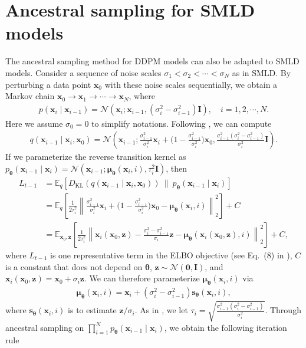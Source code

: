 \documentclass{article} %
\newcommand{\mbb}[1]{\mathbb{#1}}
\newcommand{\mcal}{\mathcal}
\newcommand{\norm}[1]{\left\lVert#1\right\rVert}
\newcommand{\bfx}{\mathbf{x}}
\newcommand{\bfz}{\mathbf{z}}
\newcommand{\bfI}{\mathbf{I}}
\newcommand{\bfzero}{\mathbf{0}}
\newcommand{\bftheta}{{\boldsymbol{\theta}}}
\newcommand{\bfs}{\mathbf{s}}
\newcommand{\bfmu}{{\boldsymbol \mu}}
\begin{document}
\section{Ancestral sampling for SMLD models}\label{app:ancestral}
The ancestral sampling method for DDPM models can also be adapted to SMLD models. Consider a sequence of noise scales $\sigma_1 < \sigma_2 < \cdots < \sigma_N$ as in SMLD. By perturbing a data point $\bfx_0$ with these noise scales sequentially, we obtain a Markov chain $\bfx_0 \to \bfx_1 \to \cdots \to \bfx_N$, where
\begin{align*}
    p(\bfx_i \mid \bfx_{i-1}) = \mcal{N}(\bfx_i; \bfx_{i-1}, (\sigma_i^2 - \sigma_{i-1}^2)\bfI), \quad i=1,2,\cdots,N.
\end{align*}
Here we assume $\sigma_0 = 0$ to simplify notations. Following \citet{ho2020denoising}, we can compute
\begin{align*}
    q(\bfx_{i-1} \mid \bfx_i, \bfx_0) = \mcal{N}\left(\bfx_{i-1}; \frac{\sigma_{i-1}^2}{\sigma_{i}^2}\bfx_i + \Big( 1 - \frac{\sigma_{i-1}^2}{\sigma_i^2} \Big)\bfx_0, \frac{\sigma_{i-1}^2 (\sigma_i^2 - \sigma_{i-1}^2)}{\sigma_i^2} \bfI  \right).
\end{align*}
If we parameterize the reverse transition kernel as $p_\bftheta(\bfx_{i-1} \mid \bfx_i) = \mcal{N}(\bfx_{i-1}; \bfmu_\bftheta(\bfx_i, i), \tau^2_i \bfI)$, then
\begin{align*}
    L_{t-1} &= \mbb{E}_q[D_{\text{KL}}(q(\bfx_{i-1} \mid \bfx_i, \bfx_0))~\|~p_\bftheta(\bfx_{i-1} \mid \bfx_i)]\\
    &= \mbb{E}_q\left[\frac{1}{2\tau^2_i} \norm{\frac{\sigma_{i-1}^2}{\sigma_{i}^2}\bfx_i + \Big( 1 - \frac{\sigma_{i-1}^2}{\sigma_i^2} \Big)\bfx_0 - \bfmu_\bftheta(\bfx_i, i)}_2^2 \right] + C\\
    &=\mbb{E}_{\bfx_0, \bfz}\left[\frac{1}{2\tau^2_i} \norm{\bfx_i(\bfx_0, \bfz) - \frac{\sigma_i^2 - \sigma_{i-1}^2}{\sigma_i} \bfz - \bfmu_\bftheta(\bfx_i(\bfx_0, \bfz), i)}_2^2 \right] + C,
\end{align*}
where $L_{t-1}$ is one representative term in the ELBO objective (see Eq.~(8) in \citet{ho2020denoising}), $C$ is a constant that does not depend on $\bftheta$, $\bfz \sim \mcal{N}(\bfzero, \bfI)$, and $\bfx_i(\bfx_0, \bfz) = \bfx_0 + \sigma_i \bfz$. We can therefore parameterize $\bfmu_\bftheta(\bfx_i, i)$ via
\begin{align*}
    \bfmu_\bftheta(\bfx_i, i) = \bfx_i + (\sigma_i^2 - \sigma_{i-1}^2) \bfs_\bftheta(\bfx_i, i),
\end{align*}
where $\bfs_\bftheta(\bfx_i, i)$ is to estimate $\bfz / \sigma_i$. As in \citet{ho2020denoising}, we let $\tau_i = \sqrt{\frac{\sigma_{i-1}^2 (\sigma_i^2 - \sigma_{i-1}^2)}{\sigma_i^2}}$. Through ancestral sampling on $\prod_{i=1}^N p_\bftheta(\bfx_{i-1} \mid \bfx_i)$, we obtain the following iteration rule
\end{document}
